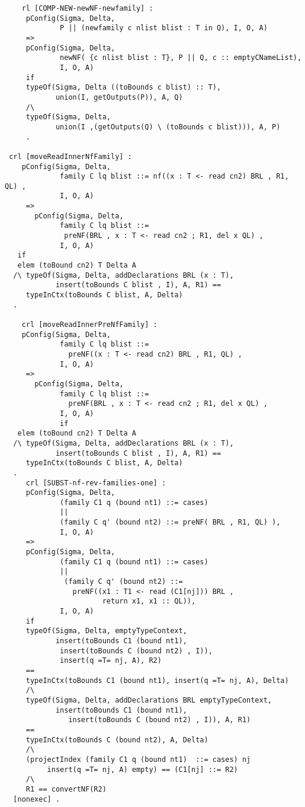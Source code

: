 \begin{lstlisting}
    rl [COMP-NEW-newNF-newfamily] :
     pConfig(Sigma, Delta, 
             P || (newfamily c nlist blist : T in Q), I, O, A)
     =>  
     pConfig(Sigma, Delta, 
             newNF( {c nlist blist : T}, P || Q, c :: emptyCNameList), 
             I, O, A)
     if 
     typeOf(Sigma, Delta ((toBounds c blist) :: T), 
            union(I, getOutputs(P)), A, Q)
     /\
     typeOf(Sigma, Delta, 
            union(I ,(getOutputs(Q) \ (toBounds c blist))), A, P) 
     .              
 
 crl [moveReadInnerNfFamily] :
    pConfig(Sigma, Delta,
             family C lq blist ::= nf((x : T <- read cn2) BRL , R1, QL) ,
             I, O, A)  
     => 
       pConfig(Sigma, Delta,
             family C lq blist ::= 
              preNF(BRL , x : T <- read cn2 ; R1, del x QL) ,
             I, O, A)
   if          
   elem (toBound cn2) T Delta A 
  /\ typeOf(Sigma, Delta, addDeclarations BRL (x : T), 
            insert(toBounds C blist , I), A, R1) == 
     typeInCtx(toBounds C blist, A, Delta)              
  .  
  
    crl [moveReadInnerPreNfFamily] :
    pConfig(Sigma, Delta,
             family C lq blist ::= 
               preNF((x : T <- read cn2) BRL , R1, QL) ,
             I, O, A)  
     => 
       pConfig(Sigma, Delta,
             family C lq blist ::= 
               preNF(BRL , x : T <- read cn2 ; R1, del x QL) ,
             I, O, A) 
             if          
   elem (toBound cn2) T Delta A 
  /\ typeOf(Sigma, Delta, addDeclarations BRL (x : T), 
            insert(toBounds C blist , I), A, R1) == 
     typeInCtx(toBounds C blist, A, Delta)          
  .   
     crl [SUBST-nf-rev-families-one] : 
     pConfig(Sigma, Delta,
             (family C1 q (bound nt1) ::= cases) 
             || 
             (family C q' (bound nt2) ::= preNF( BRL , R1, QL) ),
             I, O, A)  
     => 
     pConfig(Sigma, Delta,
             (family C1 q (bound nt1) ::= cases) 
             || 
              (family C q' (bound nt2) ::= 
                preNF((x1 : T1 <- read (C1[nj])) BRL , 
                       return x1, x1 :: QL)),
             I, O, A) 
     if 
     typeOf(Sigma, Delta, emptyTypeContext, 
            insert(toBounds C1 (bound nt1), 
             insert(toBounds C (bound nt2) , I)), 
             insert(q =T= nj, A), R2) 
     == 
     typeInCtx(toBounds C1 (bound nt1), insert(q =T= nj, A), Delta) 
     /\
     typeOf(Sigma, Delta, addDeclarations BRL emptyTypeContext, 
            insert(toBounds C1 (bound nt1), 
               insert(toBounds C (bound nt2) , I)), A, R1) 
     == 
     typeInCtx(toBounds C (bound nt2), A, Delta) 
     /\       
     (projectIndex (family C1 q (bound nt1)  ::= cases) nj 
          insert(q =T= nj, A) empty) == (C1[nj] ::= R2)
     /\ 
     R1 == convertNF(R2)               
  [nonexec] . 
  

\end{lstlisting}
